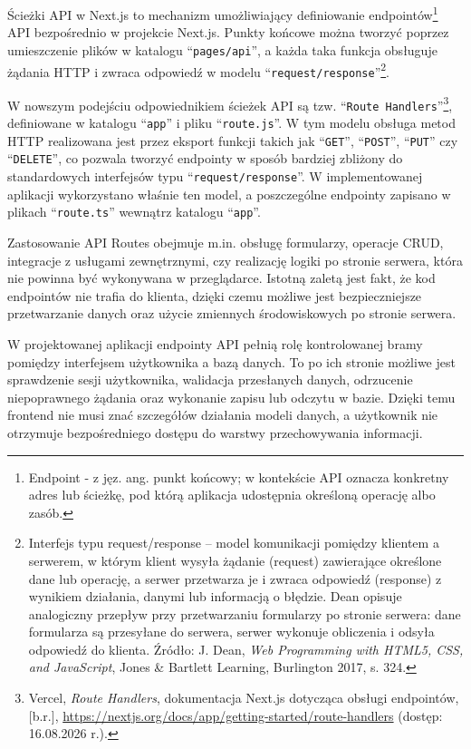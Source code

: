 \documentclass[12pt,a4paper,twoside]{report}
\newcommand{\FirstParagraph}{\noindent\ignorespaces}
\begin{document}
\FirstParagraph Ścieżki API w Next.js to mechanizm umożliwiający definiowanie endpointów\footnote{Endpoint - z jęz. ang. punkt końcowy; w kontekście API oznacza konkretny adres lub ścieżkę, pod którą aplikacja udostępnia określoną operację albo zasób.} API bezpośrednio w projekcie Next.js. Punkty końcowe można tworzyć poprzez umieszczenie plików w katalogu ``\texttt{pages/api}'', a każda taka funkcja obsługuje żądania HTTP i zwraca odpowiedź w modelu ``\texttt{request/response}''\footnote{Interfejs typu request/response -- model komunikacji pomiędzy klientem a serwerem, w którym klient wysyła żądanie (request) zawierające określone dane lub operację, a serwer przetwarza je i zwraca odpowiedź (response) z wynikiem działania, danymi lub informacją o błędzie. Dean opisuje analogiczny przepływ przy przetwarzaniu formularzy po stronie serwera: dane formularza są przesyłane do serwera, serwer wykonuje obliczenia i odsyła odpowiedź do klienta. Źródło: J. Dean, \emph{Web Programming with HTML5, CSS, and JavaScript}, Jones \& Bartlett Learning, Burlington 2017, s. 324.}.

W nowszym podejściu odpowiednikiem ścieżek API są tzw. ``\texttt{Route Handlers}''\footnote{Vercel, \emph{Route Handlers}, dokumentacja Next.js dotycząca obsługi endpointów, [b.r.], \url{https://nextjs.org/docs/app/getting-started/route-handlers} (dostęp: 16.08.2026 r.).}, definiowane w katalogu ``\texttt{app}'' i pliku ``\texttt{route.js}''. W tym modelu obsługa metod HTTP realizowana jest przez eksport funkcji takich jak ``\texttt{GET}'', ``\texttt{POST}'', ``\texttt{PUT}'' czy ``\texttt{DELETE}'', co pozwala tworzyć endpointy w sposób bardziej zbliżony do standardowych interfejsów typu ``\texttt{request/response}''. W implementowanej aplikacji wykorzystano właśnie ten model, a poszczególne endpointy zapisano w plikach ``\texttt{route.ts}'' wewnątrz katalogu ``\texttt{app}''.

Zastosowanie API Routes obejmuje m.in. obsługę formularzy, operacje CRUD, integracje z usługami zewnętrznymi, czy realizację logiki po stronie serwera, która nie powinna być wykonywana w przeglądarce. Istotną zaletą jest fakt, że kod endpointów nie trafia do klienta, dzięki czemu możliwe jest bezpieczniejsze przetwarzanie danych oraz użycie zmiennych środowiskowych po stronie serwera.

W projektowanej aplikacji endpointy API pełnią rolę kontrolowanej bramy pomiędzy interfejsem użytkownika a bazą danych. To po ich stronie możliwe jest sprawdzenie sesji użytkownika, walidacja przesłanych danych, odrzucenie niepoprawnego żądania oraz wykonanie zapisu lub odczytu w bazie. Dzięki temu frontend nie musi znać szczegółów działania modeli danych, a użytkownik nie otrzymuje bezpośredniego dostępu do warstwy przechowywania informacji.
\end{document}
